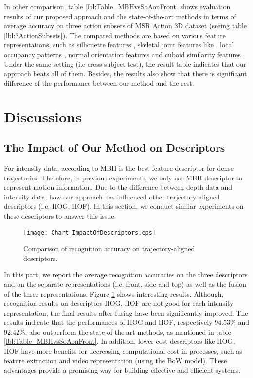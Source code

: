 \documentclass[final,3p,times,twocolumn]{elsarticle}
\begin{document}
In other comparison, table \ref{lbl:Table_MBHvsSoAonFront} shows evaluation results of our proposed approach and the state-of-the-art methods in terms of average accuracy on three action subsets of MSR Action 3D dataset (seeing table \ref{lbl:3ActionSubsets}). The compared methods are based on various feature representations, such as silhouette features \cite{li2010action, yang2012recognizing}, skeletal joint features like \cite{yang2012eigenjoints, wang2012mining}, local occupancy patterns \cite{wang2012robust, vieira2012stop}, normal orientation features \cite{oreifej2013hon4d} and cuboid similarity features \cite{xia2013spatio}. Under the same setting (i.e cross subject test), the result table indicates that our approach beats all of them. Besides, the results also show that there is significant difference of the performance between our method and the rest.

\section{Discussions}
\label{lbl:Discussions}

\subsection{The Impact of Our Method on Descriptors}

For intensity data, according to \cite{wang2011densetraj} MBH is the best feature descriptor for dense trajectories. Therefore, in previous experiments, we only use MBH descriptor to represent motion information. Due to the difference between depth data and intensity data, how our approach has influenced other trajectory-aligned descriptors (i.e. HOG, HOF). In this section, we conduct similar experiments on these descriptors to answer this issue.

\begin{figure}[h]
	\begin{center}
		\texttt{[image: Chart\_ImpactOfDescriptors.eps]}
	\end{center}
	\caption{\label{lbl:Figure_MBHHOGHOF}Comparison of recognition accuracy on trajectory-aligned descriptors.}
\end{figure}

In this part, we report the average recognition accuracies on the three descriptors and on the separate representations (i.e. front, side and top) as well as the fusion of the three representations. Figure \ref{lbl:Figure_MBHHOGHOF} shows interesting results. Although, recognition results on descriptors HOG, HOF are not good for each intensity representation, the final results after fusing have been significantly improved. The results indicate that the performances of HOG and HOF, respectively 94.53\% and 92.42\%, also outperform the state-of-the-art methods, as mentioned in table \ref{lbl:Table_MBHvsSoAonFront}. In addition, lower-cost descriptors like HOG, HOF have more benefits for decreasing computational cost in processes, such as feature extraction and video representation (using the BoW model). These advantages provide a promising way for building effective and efficient systems.
\end{document}
